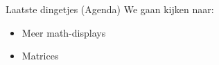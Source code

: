 \begin{frame}[fragile]{Laatste dingetjes (Agenda)} 
    We gaan kijken naar:
\begin{itemize}[label={\textbullet}]
    \item Meer math-displays
    \pause
    \item Matrices 
\end{itemize}
\end{frame}